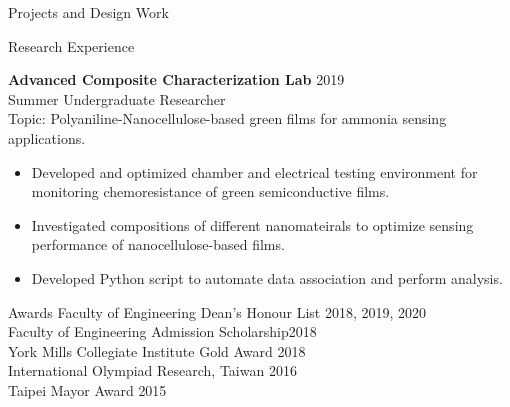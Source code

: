 \documentclass{my_resume} %
\begin{document}
\begin{minipage}[t]{0.66\textwidth}
\begin{rSection}{Projects and Design Work}
\begin{itemize}
        \end{itemize}

    \vspace{5pt}
    \end{rSection}




    \begin{rSection}{Research Experience}
    
        \textbf{Advanced Composite Characterization Lab}     \hfill{2019}\\
        Summer Undergraduate Researcher\\
        Topic: Polyaniline-Nanocellulose-based green films for ammonia sensing applications. 
        \begin{itemize}
            \item Developed and optimized chamber and electrical testing environment for monitoring chemoresistance of green semiconductive films. 
            \item Investigated compositions of different nanomateirals to optimize sensing performance of nanocellulose-based films.
            \item Developed Python script to automate data association and perform analysis.
        \end{itemize}


    \end{rSection}

        

    \begin{rSection}{Awards}
        Faculty of Engineering Dean's Honour List \hfill{2018, 2019, 2020} \\
        Faculty of Engineering Admission Scholarship\hfill{2018} \\
        York Mills Collegiate Institute Gold Award  \hfill{2018}\\ 
        International Olympiad Research, Taiwan \hfill{2016} \\
        Taipei Mayor Award \hfill{2015}
    \end{rSection}




\end{minipage}
\end{document}
